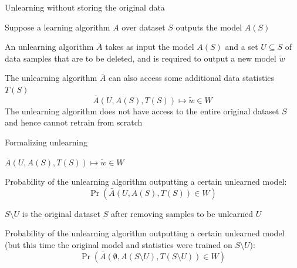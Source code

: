 \documentclass[12pt,aspectratio=169,handout]{beamer}
\begin{document}
\begin{frame}{Unlearning without storing the original data}

Suppose a learning algorithm $A$ over dataset $S$ outputs the model $A(S)$

An unlearning algorithm $\bar{A}$ takes as input the model $A(S)$ and a set $U \subseteq S$ of data samples that are to be deleted, and is required to output a new model $\tilde{w}$

The unlearning algorithm $\bar{A}$ can also access some additional data statistics $T(S)$
$$
\bar{A}(U, A(S), T(S)) \mapsto \tilde{w} \in W
$$
The unlearning algorithm does not have access to the entire original dataset $S$ and hence cannot retrain from scratch


\end{frame}


\begin{frame}{Formalizing unlearning}

$\bar{A}(U, A(S), T(S)) \mapsto \tilde{w} \in W$

Probability of the unlearning algorithm outputting a certain unlearned model:
$$
\Pr(\bar{A}(U, A(S), T(S)) \in W)
$$

$S \setminus U$ is the original dataset $S$ after removing samples to be unlearned $U$


Probability of the unlearning algorithm outputting a certain unlearned model (but this time the original model and statistics were trained on $S \setminus U$):
$$
\Pr(\bar{A}(\emptyset, A(S \setminus U), T(S \setminus U)) \in W)
$$


\end{frame}
\end{document}

